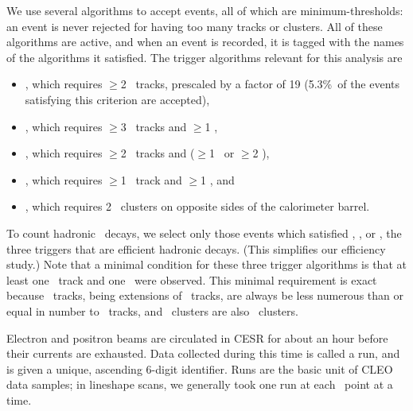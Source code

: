 \documentclass{cornell}
\begin{document}
We use several algorithms to accept events, all of which are
minimum-thresholds: an event is never rejected for having too many
tracks or clusters.  All of these algorithms are active, and when an
event is recorded, it is tagged with the names of the algorithms it
satisfied.  The trigger algorithms relevant for this analysis are
\begin{itemize}

  \item \twotrack, which requires $\ge$2 \axial\ tracks, prescaled by
  a factor of 19 (5.3\%~of the events satisfying this criterion are
  accepted),

  \item \hadron, which requires $\ge$3 \axial\ tracks and $\ge$1 \cblo, \label{pag:triggerdefs}

  \item \radtau, which requires $\ge$2 \stereo\ tracks and ($\ge$1 \cbmd\ or $\ge$2 \cblo),

  \item \eltrack, which requires $\ge$1 \axial\ track and $\ge$1 \cblo, and

  \item \barrelbhabha, which requires 2 \cbhi\ clusters on opposite
  sides of the calorimeter barrel.

\end{itemize}
To count hadronic \ups\ decays, we select only those events which
satisfied \hadron, \radtau, or \eltrack, the three triggers that are
efficient hadronic decays.  (This simplifies our efficiency study.)
Note that a minimal condition for these three trigger algorithms is
that at least one \axial\ track and one \cblo\ were observed.  This
minimal requirement is exact because \stereo\ tracks, being extensions
of \axial\ tracks, are always be less numerous than or equal in number
to \axial\ tracks, and \cbmd\ clusters are also \cblo\ clusters.

Electron and positron beams are circulated in CESR for about an hour
before their currents are exhausted.  Data collected during this time
is called a run, and is given a unique, ascending 6-digit identifier.
Runs are the basic unit of CLEO data samples; in lineshape scans, we
generally took one run at each \ecm\ point at a time.
\end{document}
